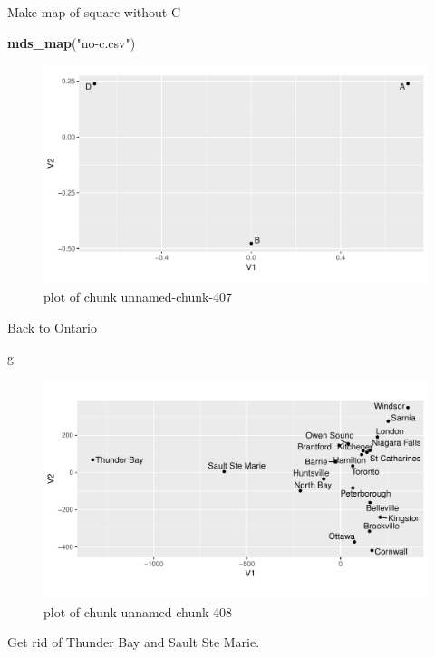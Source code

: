 \documentclass[ignorenonframetext,]{beamer}
\newenvironment{Shaded}{\begin{snugshade}}{\end{snugshade}}
\newcommand{\KeywordTok}[1]{\textcolor[rgb]{0.13,0.29,0.53}{\textbf{#1}}}
\newcommand{\NormalTok}[1]{#1}
\newcommand{\StringTok}[1]{\textcolor[rgb]{0.31,0.60,0.02}{#1}}
\begin{document}
\begin{frame}[fragile]{Make map of square-without-C}
\protect\hypertarget{make-map-of-square-without-c}{}

\begin{Shaded}
\begin{Highlighting}[]
\KeywordTok{mds_map}\NormalTok{(}\StringTok{"no-c.csv"}\NormalTok{)}
\end{Highlighting}
\end{Shaded}

\begin{figure}
\centering
\includegraphics{figure/unnamed-chunk-407-1.pdf}
\caption{plot of chunk unnamed-chunk-407}
\end{figure}

\end{frame}

\begin{frame}[fragile]{Back to Ontario}
\protect\hypertarget{back-to-ontario}{}

\begin{Shaded}
\begin{Highlighting}[]
\NormalTok{g}
\end{Highlighting}
\end{Shaded}

\begin{figure}
\centering
\includegraphics{figure/unnamed-chunk-408-1.pdf}
\caption{plot of chunk unnamed-chunk-408}
\end{figure}

Get rid of Thunder Bay and Sault Ste Marie.

\end{frame}
\end{document}
